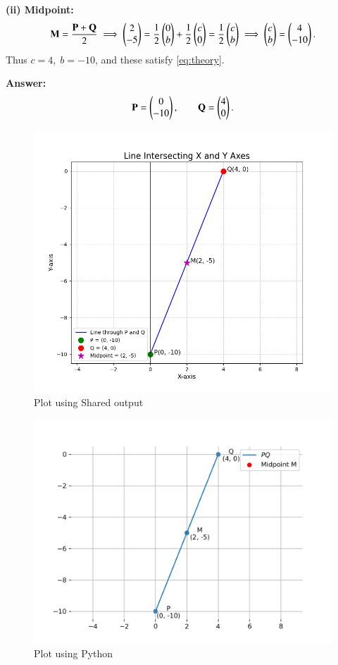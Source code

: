 \documentclass[journal]{IEEEtran}
\begin{document}
\textbf{(ii) Midpoint: }
\begin{align}
\mathbf M=\frac{\mathbf P+\mathbf Q}{2}
\;\Longrightarrow\;
\begin{pmatrix}2\\ -5\end{pmatrix}
=\frac{1}{2}\begin{pmatrix}0\\ b\end{pmatrix}+\frac{1}{2}\begin{pmatrix}c\\ 0\end{pmatrix}
=\frac{1}{2}\begin{pmatrix}c\\ b\end{pmatrix}
\;\Longrightarrow\;
\begin{pmatrix}c\\ b\end{pmatrix}=\begin{pmatrix}4\\ -10\end{pmatrix}.
\end{align}
Thus \(c=4,\; b=-10\), and these satisfy \ref{eq:theory}.

\textbf{Answer: }
\[
\mathbf P=\begin{pmatrix}0\\ -10\end{pmatrix},\qquad
\mathbf Q=\begin{pmatrix}4\\ 0\end{pmatrix}.
\]
\begin{figure}[h!]
    \centering
    \includegraphics[width=0.6\columnwidth]{figs/Figure_1.png}
    \caption{Plot using Shared output}
\end{figure}

\begin{figure}[h!]
    \centering
    \includegraphics[width=0.6\columnwidth]{figs/fig.png}
    \caption{Plot using Python}
\end{figure}
\end{document}
